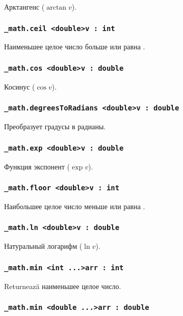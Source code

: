Арктангенс ($\arctan{v}$).

\subsubsection{\lstinline|_math.ceil <double>v : int|}

Наименьшее целое число больше или равна .

\subsubsection{\lstinline|_math.cos <double>v : double|}

Косинус ($\cos{v}$).

\subsubsection{\lstinline|_math.degreesToRadians <double>v : double|}

Преобразует градусы в радианы.

\subsubsection{\lstinline|_math.exp <double>v : double|}

Функция экспонент ($\exp{v}$).

\subsubsection{\lstinline|_math.floor <double>v : int|}

Наибольшее целое число меньше или равна .

\subsubsection{\lstinline|_math.ln <double>v : double|}

Натуральный логарифм ($\ln{v}$).

\subsubsection{\lstinline|_math.min <int ...>arr : int|}

Returnează наименьшее целое число.

\subsubsection{\lstinline|_math.min <double ...>arr : double|}

